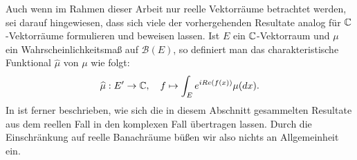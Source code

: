 \begin{remark}
    Auch wenn im Rahmen dieser Arbeit nur reelle Vektorräume betrachtet werden, sei darauf hingewiesen, dass sich viele der vorhergehenden Resultate analog für $\mathbb{C}$-Vektorräume formulieren und beweisen lassen. 
    Ist $E$ ein $\mathbb{C}$-Vektorraum und $\mu$ ein Wahrscheinlichkeitsmaß auf $\mathcal{B}(E)$, so definiert man das charakteristische Funktional $\widehat{\mu}$ von $\mu$ wie folgt:
    $$
        \widehat{\mu}: E' \to \mathbb{C}, \quad f \mapsto \int_E e^{iRe(f(x))}\mu(dx). 
    $$
    In \cite[Lemma E.1.15]{van-neerven} ist ferner beschrieben, wie sich die in diesem Abschnitt gesammelten Resultate aus dem reellen Fall in den komplexen Fall übertragen lassen.
    Durch die Einschränkung auf reelle Banachräume büßen wir also nichts an Allgemeinheit ein. 
\end{remark}

